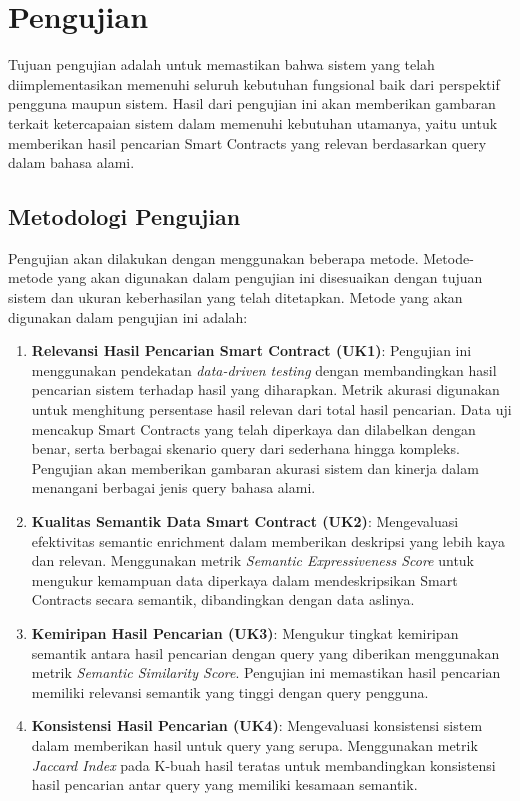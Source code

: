 \section{Pengujian}

Tujuan pengujian adalah untuk memastikan bahwa sistem yang telah diimplementasikan memenuhi seluruh kebutuhan fungsional baik dari perspektif pengguna maupun sistem. Hasil dari pengujian ini akan memberikan gambaran terkait ketercapaian sistem dalam memenuhi kebutuhan utamanya, yaitu untuk memberikan hasil pencarian Smart Contracts yang relevan berdasarkan query dalam bahasa alami.

\subsection{Metodologi Pengujian}

Pengujian akan dilakukan dengan menggunakan beberapa metode. Metode-metode yang akan digunakan dalam pengujian ini disesuaikan dengan tujuan sistem dan ukuran keberhasilan yang telah ditetapkan. Metode yang akan digunakan dalam pengujian ini adalah:

\begin{enumerate}
    \item \textbf{Relevansi Hasil Pencarian Smart Contract (UK1)}: Pengujian ini menggunakan pendekatan \textit{data-driven testing} dengan membandingkan hasil pencarian sistem terhadap hasil yang diharapkan. Metrik akurasi digunakan untuk menghitung persentase hasil relevan dari total hasil pencarian. Data uji mencakup Smart Contracts yang telah diperkaya dan dilabelkan dengan benar, serta berbagai skenario query dari sederhana hingga kompleks. Pengujian akan memberikan gambaran akurasi sistem dan kinerja dalam menangani berbagai jenis query bahasa alami.
    \item \textbf{Kualitas Semantik Data Smart Contract (UK2)}: Mengevaluasi efektivitas semantic enrichment dalam memberikan deskripsi yang lebih kaya dan relevan. Menggunakan metrik \textit{Semantic Expressiveness Score} untuk mengukur kemampuan data diperkaya dalam mendeskripsikan Smart Contracts secara semantik, dibandingkan dengan data aslinya.
    \item \textbf{Kemiripan Hasil Pencarian (UK3)}: Mengukur tingkat kemiripan semantik antara hasil pencarian dengan query yang diberikan menggunakan metrik \textit{Semantic Similarity Score}. Pengujian ini memastikan hasil pencarian memiliki relevansi semantik yang tinggi dengan query pengguna.
    \item \textbf{Konsistensi Hasil Pencarian (UK4)}: Mengevaluasi konsistensi sistem dalam memberikan hasil untuk query yang serupa. Menggunakan metrik \textit{Jaccard Index} pada K-buah hasil teratas untuk membandingkan konsistensi hasil pencarian antar query yang memiliki kesamaan semantik.
\end{enumerate}


